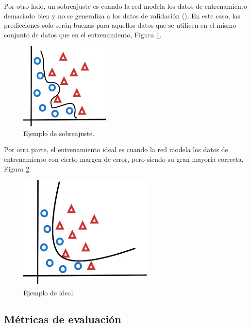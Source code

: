Por otro lado, un sobreajuste es cuando la red modela los datos de entrenamiento demasiado bien y no se generaliza a los datos de validación (\cite{rosebrock2017deep}). En este caso, las predicciones solo serán buenas para aquellos datos que se utilicen en el mismo conjunto de datos que en el entrenamiento, Figura \ref{fig:underFiting}.

\begin{figure}[H]
    \centering
    \includegraphics[width=0.4\textwidth]{MarcoTeorico/imgs/Ajuste_sobreajuste.jpg}
    \caption{Ejemplo de sobreajuste.}
    \label{fig:underFiting}
\end{figure}

Por otra parte, el entrenamiento ideal es cuando la red modela los datos de entrenamiento con cierto margen de error, pero siendo su gran mayoría correcta, Figura \ref{fig:idealFiting}.

\begin{figure}[H]
    \centering
    \includegraphics[width=0.6\textwidth]{MarcoTeorico/imgs/Ajuste_ideal.jpg}
    \caption{Ejemplo de ideal.}
    \label{fig:idealFiting}
\end{figure}

\subsection{Métricas de evaluación}


